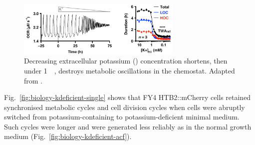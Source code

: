 \begin{figure}[hb!]
  \centering
  \includegraphics[width=0.7\textwidth]{oneillEukaryoticCellBiology2020_4_adapted.png}
  \caption{
    Decreasing extracellular potassium () concentration shortens, then under \SI{1}{\milli\molar}, destroys metabolic oscillations in the chemostat.
    Adapted from \textcite{oneillEukaryoticCellBiology2020}.
  }
  \label{fig:biology-kdeficient-oneill}
\end{figure}

Fig.\ \ref{fig:biology-kdeficient-single} shows that FY4 HTB2::mCherry cells retained synchronised metabolic cycles and cell division cycles when cells were abruptly switched from potassium-containing to potassium-deficient minimal medium.
Such cycles were longer and were generated less reliably as in the normal growth medium (Fig.\ \ref{fig:biology-kdeficient-acf}).

